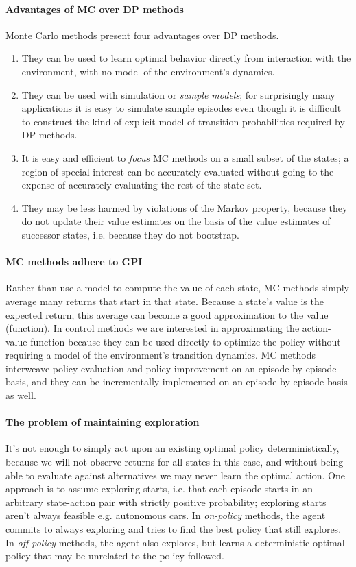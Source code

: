 \documentclass[12pt]{article}
\begin{document}
\paragraph{Advantages of MC over DP methods}
Monte Carlo methods present four advantages over DP methods.
\begin{enumerate}
\item They can be used to learn optimal behavior directly from interaction with   the environment, with no model of the environment's dynamics.
\item They can be used with simulation or \emph{sample models}; for surprisingly many applications it is easy to simulate sample episodes even though it is difficult to construct the kind of explicit model of transition probabilities required by DP methods.
\item It is easy and efficient to \emph{focus} MC methods on a small subset of the states; a region of special interest can be accurately evaluated without going to the expense of accurately evaluating the rest of the state set.
\item They may be less harmed by violations of the Markov property, because they do not update their value estimates on the basis of the value estimates of successor states, i.e. because they do not bootstrap.
\end{enumerate}

\paragraph{MC methods adhere to GPI}
Rather than use a model to compute the value of each state, MC methods simply average many returns that start in that state. Because a state's value is the expected return, this average can become a good approximation to the value (function). In control methods we are interested in approximating the action-value function because they can be used directly to optimize the policy without requiring a model of the environment's transition dynamics. MC methods interweave policy evaluation and policy improvement on an episode-by-episode basis, and they can be incrementally implemented on an episode-by-episode basis as well.

\paragraph{The problem of maintaining exploration} It's not enough to simply act upon an existing optimal policy deterministically, because we will not observe returns for all states in this case, and without being able to evaluate against alternatives we may never learn the optimal action. One approach is to assume exploring starts, i.e. that each episode starts in an arbitrary state-action pair with strictly positive probability; exploring starts aren't always feasible e.g. autonomous cars. In \emph{on-policy} methods, the agent commits to always exploring and tries to find the best policy that still explores. In \emph{off-policy} methods, the agent also explores, but learns a deterministic optimal policy that may be unrelated to the policy followed.
\end{document}
